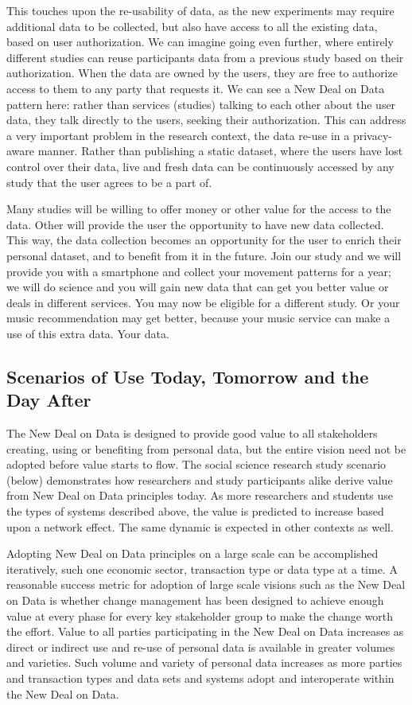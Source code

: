 This touches upon the re-usability of data, as the new experiments may require additional data to be collected, but also have access to all the existing data, based on user authorization.
We can imagine going even further, where entirely different studies can reuse participants data from a previous study based on their authorization.
When the data are owned by the users, they are free to authorize access to them to any party that requests it. We can see a New Deal on Data pattern here: rather than services (studies) talking to each other about the user data, they talk directly to the users, seeking their authorization.
This can address a very important problem in the research context, the data re-use in a privacy-aware manner.
Rather than publishing a static dataset, where the users have lost control over their data, live and fresh data can be continuously accessed by any study that the user agrees to be a part of.

Many studies will be willing to offer money or other value for the access to the data.
Other will provide the user the opportunity to have new data collected.
This way, the data collection becomes an opportunity for the user to enrich their personal dataset, and to benefit from it in the future.
Join our study and we will provide you with a smartphone and collect your movement patterns for a year; we will do science and you will gain new data that can get you better value or deals in different services.
You may now be eligible for a different study.
Or your music recommendation may get better, because your music service can make a use of this extra data.
Your data.

 \subsection{Scenarios of Use Today, Tomorrow and the Day After}


The New Deal on Data is designed to provide good value to all stakeholders creating, using or benefiting from personal data, but the entire vision need not be adopted before value starts to flow. The social science research study scenario (below) demonstrates how researchers and study participants alike derive value from New Deal on Data principles today.  As more researchers and students use the types of systems described above, the value is predicted to increase based upon a network effect.  The same dynamic is expected in other contexts as well. 

Adopting New Deal on Data principles on a large scale can be accomplished iteratively, such one economic sector, transaction type or data type at a time.  A reasonable success metric for adoption of large scale visions such as the New Deal on Data is whether change management has been designed to achieve enough value at every phase for every key stakeholder group to make the change worth the effort.  Value to all parties participating in the New Deal on Data increases as direct or indirect use and re-use of personal data is available in greater volumes and varieties.  Such volume and variety of personal data increases as more parties and transaction types and data sets and systems adopt and interoperate within the New Deal on Data.    

